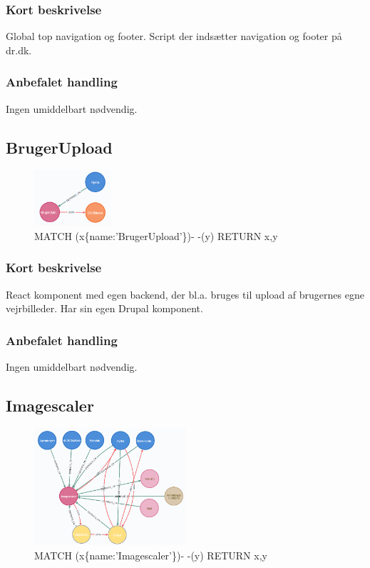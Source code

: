 \documentclass{article}
\begin{document}
\subsubsection*{Kort beskrivelse}
Global top navigation og footer.
Script der indsætter navigation og footer på dr.dk.
\subsubsection*{Anbefalet handling}
Ingen umiddelbart nødvendig.


\subsection{BrugerUpload}
\begin{figure}[h]
\includegraphics[width=80pt]{BrugerUpload.PNG}
\caption{MATCH (x\{name:'BrugerUpload'\})- -(y) RETURN x,y}
\end{figure}
\subsubsection*{Kort beskrivelse}
React komponent med egen backend, der bl.a. bruges til upload af brugernes egne vejrbilleder. Har sin egen Drupal komponent.
\subsubsection*{Anbefalet handling}
Ingen umiddelbart nødvendig.


\subsection{Imagescaler}
\begin{figure}[h]
\includegraphics[width=160pt]{Imagescaler.PNG}
\caption{MATCH (x\{name:'Imagescaler'\})- -(y) RETURN x,y}
\end{figure}
\end{document}
